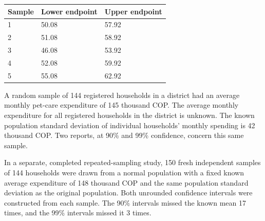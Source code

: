 \begin{center}\begin{tabular}{@{}lll@{}}\toprule
Sample & Lower endpoint & Upper endpoint\\\midrule
1 & 50.08 & 57.92\\
2 & 51.08 & 58.92\\
3 & 46.08 & 53.92\\
4 & 52.08 & 59.92\\
5 & 55.08 & 62.92\\
\bottomrule\end{tabular}\end{center}


\BlankInformationTable

\clearpage
{}

\workspace{1.5in}
\vfill


\clearpage
{}
A random sample of 144 registered households in a district had an average monthly pet-care expenditure of 145 thousand COP. The average monthly expenditure for all registered households in the district is unknown. The known population standard deviation of individual households' monthly spending is 42 thousand COP. Two reports, at 90\% and 99\% confidence, concern this same sample.

In a separate, completed repeated-sampling study, 150 fresh independent samples of 144 households were drawn from a normal population with a fixed known average expenditure of 148 thousand COP and the same population standard deviation as the original population. Both unrounded confidence intervals were constructed from each sample. The 90\% intervals missed the known mean 17 times, and the 99\% intervals missed it 3 times.

